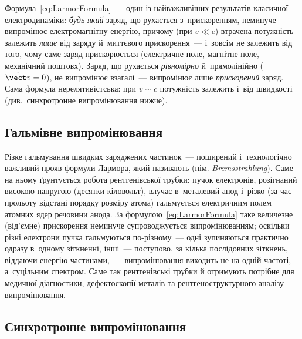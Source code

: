 \begin{Attention}
	Формула~\eqref{eq:LarmorFormula}~--- один із найважливіших результатів класичної
	електродинаміки: \emph{будь-який} заряд, що рухається з~прискоренням, неминуче
	випромінює електромагнітну енергію, причому (при $v\ll c$) втрачена потужність залежить \emph{лише}
	від заряду й~миттєвого прискорення~--- і~зовсім не залежить від того, чому саме заряд
	прискорюється (електричне поле, магнітне поле, механічний поштовх). Заряд, що
	рухається \emph{рівномірно} й~прямолінійно ($\dot{\vect v}=0$), не випромінює
	взагалі~--- випромінює лише \emph{прискорений} заряд. Сама формула нерелятивістська: при
	$v\sim c$ потужність залежить і~від швидкості (див.\ синхротронне випромінювання нижче).
\end{Attention}



\subsection*{Гальмівне випромінювання}



Різке гальмування швидких заряджених частинок~--- поширений і~технологічно важливий прояв
формули Лармора, який називають  (нім.
\textit{Bremsstrahlung}). Саме на ньому ґрунтується робота рентгенівської трубки: пучок
електронів, розігнаний високою напругою (десятки кіловольт), влучає в~металевий анод
і~різко (за час прольоту відстані порядку розміру атома) гальмується електричним полем атомних
ядер речовини анода. За формулою~\eqref{eq:LarmorFormula} таке величезне (від'ємне)
прискорення неминуче супроводжується випромінюванням; оскільки різні електрони пучка
гальмуються по-різному~--- одні зупиняються практично одразу в~одному зіткненні, інші~---
поступово, за кілька послідовних зіткнень, віддаючи енергію частинами,~--- випромінювання
виходить не на одній частоті, а~суцільним спектром. Саме так рентгенівські трубки й
отримують потрібне для медичної діагностики, дефектоскопії металів та рентгеноструктурного
аналізу випромінювання.



\subsection*{Синхротронне випромінювання}



